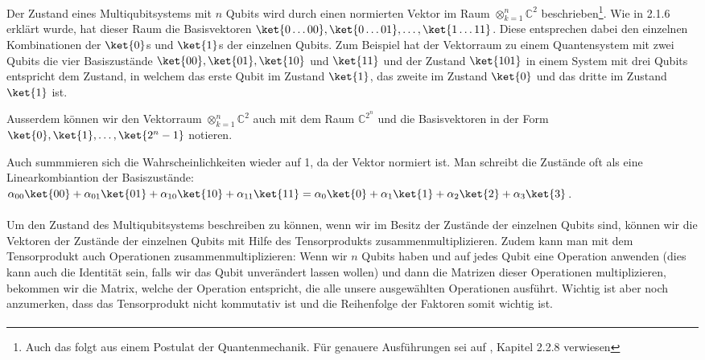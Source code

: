 Der Zustand eines Multiqubitsystems mit $n$ Qubits wird durch einen normierten Vektor im Raum $\otimes_{k = 1}^{n} \mathbb{C}^2$ beschrieben\footnote{Auch das folgt aus einem Postulat der Quantenmechanik. Für genauere Ausführungen sei auf \cite{QC}, Kapitel 2.2.8 verwiesen}. Wie in 2.1.6 erklärt wurde, hat dieser Raum die Basisvektoren $\ket{0\dots 00}, \ket{0\dots 01}, \dots, \ket{1\dots 11}$. Diese entsprechen dabei den einzelnen Kombinationen der $\ket{0}$s und $\ket{1}$s der einzelnen Qubits. Zum Beispiel hat der Vektorraum zu einem Quantensystem mit zwei Qubits die vier Basiszustände $\ket{00}, \ket{01}, \ket{10}$ und $\ket{11}$ und der Zustand $\ket{101}$ in einem System mit drei Qubits entspricht dem Zustand, in welchem das erste Qubit im Zustand $\ket{1}$, das zweite im Zustand $\ket{0}$ und das dritte im Zustand $\ket{1}$ ist. 

Ausserdem können wir den Vektorraum $\otimes_{k = 1}^{n} \mathbb{C}^2$ auch mit dem Raum $\mathbb{C}^{2^n}$ und die Basisvektoren in der Form $\ket{0}, \ket{1}, \dots, \ket{2^n - 1}$ notieren.

Auch summmieren sich die Wahrscheinlichkeiten wieder auf 1, da der Vektor normiert ist. Man schreibt die Zustände oft als eine Linearkombiantion der Basiszustände: $\alpha_{00}\ket{00} + \alpha_{01}\ket{01} + \alpha_{10}\ket{10} + \alpha_{11}\ket{11} = \alpha_{0}\ket{0} + \alpha_{1}\ket{1} + \alpha_{2}\ket{2} + \alpha_{3}\ket{3}$.

\paragraph{}
Um den Zustand des Multiqubitsystems beschreiben zu können, wenn wir im Besitz der Zustände der einzelnen Qubits sind, können wir die Vektoren der Zustände der einzelnen Qubits mit Hilfe des Tensorprodukts zusammenmultiplizieren. Zudem kann man mit dem Tensorprodukt auch Operationen zusammenmultiplizieren: Wenn wir $n$ Qubits haben und auf jedes Qubit eine Operation anwenden (dies kann auch die Identität sein, falls wir das Qubit unverändert lassen wollen) und dann die Matrizen dieser Operationen multiplizieren, bekommen wir die Matrix, welche der Operation entspricht, die alle unsere ausgewählten Operationen ausführt. Wichtig ist aber noch anzumerken, dass das Tensorprodukt nicht kommutativ ist und die Reihenfolge der Faktoren somit wichtig ist.
\paragraph{}

